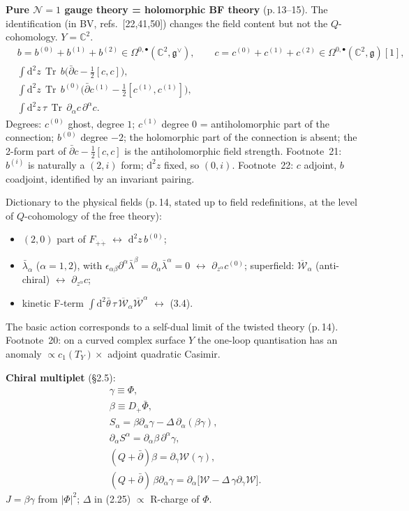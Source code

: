 \documentclass[11pt]{article}
\newcommand{\Tr}{\operatorname{Tr}}
\newcommand{\dpl}{\dot{+}}
\newcommand{\pb}{\bar{\partial}}
\begin{document}
\textbf{Pure $\mathcal N=1$ gauge theory = holomorphic BF theory} (p.\,13--15). The identification (in BV, refs.\ [22,41,50]) changes the field content but not the $Q$-cohomology. $Y=\mathbb C^2$.
\begin{align}
&b=b^{(0)}+b^{(1)}+b^{(2)}\in\Omega^{0,\bullet}(\mathbb C^2,\mathfrak g^\vee),\qquad c=c^{(0)}+c^{(1)}+c^{(2)}\in\Omega^{0,\bullet}(\mathbb C^2,\mathfrak g)[1], \tag{3.1}\\
&\int\mathrm d^2z\,\Tr\,b\Big(\pb c-\tfrac12[c,c]\Big), \tag{3.2}\\
&\int\mathrm d^2z\,\Tr\,b^{(0)}\Big(\pb c^{(1)}-\tfrac12[c^{(1)},c^{(1)}]\Big), \tag{3.3}\\
&\int\mathrm d^2z\,\tau\,\Tr\,\partial_\alpha c\,\partial^\alpha c . \tag{3.4}
\end{align}
Degrees: $c^{(0)}$ ghost, degree $1$; $c^{(1)}$ degree $0$ = antiholomorphic part of the connection; $b^{(0)}$ degree $-2$; the holomorphic part of the connection is absent; the 2-form part of $\pb c-\frac12[c,c]$ is the antiholomorphic field strength. Footnote~21: $b^{(i)}$ is naturally a $(2,i)$ form; $\mathrm d^2z$ fixed, so $(0,i)$. Footnote~22: $c$ adjoint, $b$ coadjoint, identified by an invariant pairing.

Dictionary to the physical fields (p.\,14, stated up to field redefinitions, at the level of $Q$-cohomology of the free theory):
\begin{itemize}
\item $(2,0)$ part of $F_{\dpl\dpl}$ $\leftrightarrow$ $\mathrm d^2z\,b^{(0)}$;
\item $\bar\lambda_\alpha$ ($\alpha=1,2$), with $\epsilon_{\alpha\beta}\partial^\alpha\bar\lambda^\beta=\partial_\alpha\bar\lambda^\alpha=0$ $\leftrightarrow$ $\partial_{z^\alpha}c^{(0)}$; superfield: $\overline{\mathcal W}_\alpha$ (anti-chiral) $\leftrightarrow$ $\partial_{z^\alpha}c$;
\item kinetic F-term $\int\mathrm d^2\bar\theta\,\tau\,\overline{\mathcal W}_\alpha\overline{\mathcal W}^\alpha$ $\leftrightarrow$ (3.4).
\end{itemize}
The basic action corresponds to a self-dual limit of the twisted theory (p.\,14). Footnote~20: on a curved complex surface $Y$ the one-loop quantisation has an anomaly $\propto c_1(T_Y)\times$ adjoint quadratic Casimir.

\textbf{Chiral multiplet} (§2.5):
\begin{align}
&\gamma\equiv\Phi, \tag{2.23}\\
&\beta\equiv D_{\dpl}\bar\Phi, \tag{2.24}\\
&S_\alpha=\beta\partial_\alpha\gamma-\Delta\,\partial_\alpha(\beta\gamma), \tag{2.25}\\
&\partial_\alpha S^\alpha=\partial_\alpha\beta\,\partial^\alpha\gamma, \tag{2.26}\\
&(Q+\pb)\beta=\partial_\gamma\mathcal W(\gamma), \tag{2.27}\\
&(Q+\pb)\,\beta\partial_\alpha\gamma=\partial_\alpha\big[\mathcal W-\Delta\,\gamma\partial_\gamma\mathcal W\big]. \tag{2.28}
\end{align}
$J=\beta\gamma$ from $|\Phi|^2$; $\Delta$ in (2.25) $\propto$ R-charge of $\Phi$.
\end{document}
